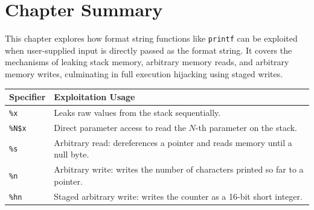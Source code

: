 \vspace{5mm}
\section*{Chapter Summary}
This chapter explores how format string functions like \texttt{printf} can be exploited when user-supplied input is directly passed as the format string. It covers the mechanisms of leaking stack memory, arbitrary memory reads, and arbitrary memory writes, culminating in full execution hijacking using staged writes.

\vspace{2mm}
\begin{center}
\begin{tabular}{|l|p{10cm}|}
\hline
\textbf{Specifier} & \textbf{Exploitation Usage} \\
\hline
\texttt{\%x} & Leaks raw values from the stack sequentially. \\
\texttt{\%N\$x} & Direct parameter access to read the $N$-th parameter on the stack. \\
\texttt{\%s} & Arbitrary read: dereferences a pointer and reads memory until a null byte. \\
\texttt{\%n} & Arbitrary write: writes the number of characters printed so far to a pointer. \\
\texttt{\%hn} & Staged arbitrary write: writes the counter as a 16-bit short integer. \\
\hline
\end{tabular}
\end{center}
